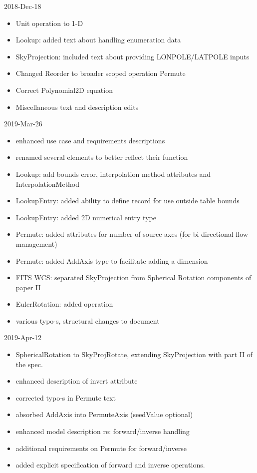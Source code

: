 \documentclass[11pt,a4paper]{ivoa}
\begin{document}
2018-Dec-18
\begin{itemize}
\item Unit operation to 1-D
\item Lookup: added text about handling enumeration data
\item SkyProjection: included text about providing LONPOLE/LATPOLE inputs
\item Changed Reorder to broader scoped operation Permute
\item Correct Polynomial2D equation
\item Miscellaneous text and description edits
\end{itemize}
2019-Mar-26
\begin{itemize}
\item enhanced use case and requirements descriptions
\item renamed several elements to better reflect their function
\item Lookup: add bounds error, interpolation method attributes and InterpolationMethod
\item LookupEntry: added ability to define record for use outside table bounds
\item LookupEntry: added 2D numerical entry type
\item Permute: added attributes for number of source axes (for bi-directional flow management)
\item Permute: added AddAxis type to facilitate adding a dimension
\item FITS WCS: separated SkyProjection from Spherical Rotation components of paper II
\item EulerRotation: added operation
\item various typo-s, structural changes to document
\end{itemize}
2019-Apr-12
\begin{itemize}
\item SphericalRotation to SkyProjRotate, extending SkyProjection with part II of the spec.
\item enhanced description of invert attribute
\item corrected typo-s in Permute text
\item absorbed AddAxis into PermuteAxis (seedValue optional)
\item enhanced model description re: forward/inverse handling
\item additional requirements on Permute for forward/inverse
\item added explicit specification of forward and inverse operations.
\end{itemize}
\end{document}
